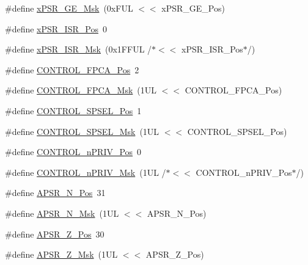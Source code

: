 \begin{DoxyCompactItemize}
\item 
\#define \hyperlink{group___c_m_s_i_s___c_o_r_e_ga967634e605d013e9b07002eca31f7903}{x\+P\+S\+R\+\_\+\+G\+E\+\_\+\+Msk}~(0x\+F\+U\+L $<$$<$ x\+P\+S\+R\+\_\+\+G\+E\+\_\+\+Pos)
\item 
\#define \hyperlink{group___c_m_s_i_s___c_o_r_e_ga21bff245fb1aef9683f693d9d7bb2233}{x\+P\+S\+R\+\_\+\+I\+S\+R\+\_\+\+Pos}~0
\item 
\#define \hyperlink{group___c_m_s_i_s___c_o_r_e_gadf8eed87e0081dfe1ef1c78a0ea91afd}{x\+P\+S\+R\+\_\+\+I\+S\+R\+\_\+\+Msk}~(0x1\+F\+F\+U\+L /$\ast$$<$$<$ x\+P\+S\+R\+\_\+\+I\+S\+R\+\_\+\+Pos$\ast$/)
\item 
\#define \hyperlink{group___c_m_s_i_s___c_o_r_e_gac7018b59b07134c5363b33eb94918a58}{C\+O\+N\+T\+R\+O\+L\+\_\+\+F\+P\+C\+A\+\_\+\+Pos}~2
\item 
\#define \hyperlink{group___c_m_s_i_s___c_o_r_e_gad20bb0212b2e1864f24af38d93587c79}{C\+O\+N\+T\+R\+O\+L\+\_\+\+F\+P\+C\+A\+\_\+\+Msk}~(1\+U\+L $<$$<$ C\+O\+N\+T\+R\+O\+L\+\_\+\+F\+P\+C\+A\+\_\+\+Pos)
\item 
\#define \hyperlink{group___c_m_s_i_s___c_o_r_e_ga07eafc53e609895342c6a530e9d01310}{C\+O\+N\+T\+R\+O\+L\+\_\+\+S\+P\+S\+E\+L\+\_\+\+Pos}~1
\item 
\#define \hyperlink{group___c_m_s_i_s___c_o_r_e_ga70b29840969b06909da21369b0b05b53}{C\+O\+N\+T\+R\+O\+L\+\_\+\+S\+P\+S\+E\+L\+\_\+\+Msk}~(1\+U\+L $<$$<$ C\+O\+N\+T\+R\+O\+L\+\_\+\+S\+P\+S\+E\+L\+\_\+\+Pos)
\item 
\#define \hyperlink{group___c_m_s_i_s___c_o_r_e_ga51b95bc03ec0d815b459bde0b14a5908}{C\+O\+N\+T\+R\+O\+L\+\_\+n\+P\+R\+I\+V\+\_\+\+Pos}~0
\item 
\#define \hyperlink{group___c_m_s_i_s___c_o_r_e_gaef3b20d77acb213338f89ce5e7bc36b0}{C\+O\+N\+T\+R\+O\+L\+\_\+n\+P\+R\+I\+V\+\_\+\+Msk}~(1\+U\+L /$\ast$$<$$<$ C\+O\+N\+T\+R\+O\+L\+\_\+n\+P\+R\+I\+V\+\_\+\+Pos$\ast$/)
\item 
\#define \hyperlink{group___c_m_s_i_s___c_o_r_e_gac469528d210043c7bd3f12f0e6824766}{A\+P\+S\+R\+\_\+\+N\+\_\+\+Pos}~31
\item 
\#define \hyperlink{group___c_m_s_i_s___c_o_r_e_gadbc2cf55a026f661b53fadfcf822cef1}{A\+P\+S\+R\+\_\+\+N\+\_\+\+Msk}~(1\+U\+L $<$$<$ A\+P\+S\+R\+\_\+\+N\+\_\+\+Pos)
\item 
\#define \hyperlink{group___c_m_s_i_s___c_o_r_e_ga3661286d108b1aca308d7445685eae3a}{A\+P\+S\+R\+\_\+\+Z\+\_\+\+Pos}~30
\item 
\#define \hyperlink{group___c_m_s_i_s___c_o_r_e_ga1deb4d1aa72bb83d1f79329406f15711}{A\+P\+S\+R\+\_\+\+Z\+\_\+\+Msk}~(1\+U\+L $<$$<$ A\+P\+S\+R\+\_\+\+Z\+\_\+\+Pos)
$$
\end{DoxyCompactItemize}

